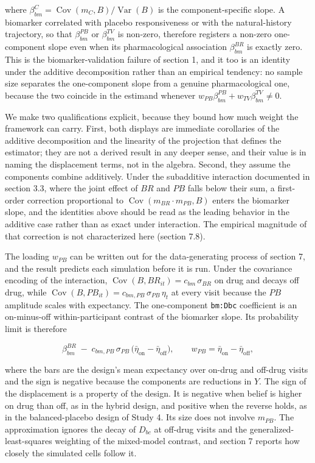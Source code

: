 \documentclass[
  11pt,
]{article}
\begin{document}
where \(\beta_{bm}^{C} = \operatorname{Cov}(m_C, B) / \operatorname{Var}(B)\) is
the component-specific slope. A biomarker correlated with placebo
responsiveness or with the natural-history trajectory, so that
\(\beta_{bm}^{PB}\) or \(\beta_{bm}^{TV}\) is non-zero, therefore registers a
non-zero one-component slope even when its pharmacological association
\(\beta_{bm}^{BR}\) is exactly zero. This is the biomarker-validation failure of
section 1, and it too is an identity under the additive decomposition rather
than an empirical tendency: no sample size separates the one-component slope
from a genuine pharmacological one, because the two coincide in the estimand
whenever \(w_{PB}\beta_{bm}^{PB} + w_{TV}\beta_{bm}^{TV} \ne 0\).

We make two qualifications explicit, because they bound how much weight the
framework can carry. First, both displays are immediate corollaries of the
additive decomposition and the linearity of the projection that defines the
estimator; they are not a derived result in any deeper sense, and their value
is in naming the displacement terms, not in the algebra. Second, they assume
the components combine additively. Under the subadditive interaction
documented in section 3.3, where the joint effect of \(BR\) and \(PB\) falls below
their sum, a first-order correction proportional to
\(\operatorname{Cov}(m_{BR}\cdot m_{PB}, B)\) enters the biomarker slope, and
the identities above should be read as the leading behavior in the additive
case rather than as exact under interaction. The empirical magnitude of that
correction is not characterized here (section 7.8).

The loading \(w_{PB}\) can be written out for the data-generating process
of section 7, and the result predicts each simulation before it is run.
Under the covariance encoding of the interaction, \(\operatorname{Cov}(B,
BR_{it}) = c_{bm}\,\sigma_{BR}\) on drug and decays off drug, while
\(\operatorname{Cov}(B, PB_{it}) = c_{bm,PB}\,\sigma_{PB}\,\eta_t\) at every
visit because the \(PB\) amplitude scales with expectancy. The one-component
\texttt{bm:Dbc} coefficient is an on-minus-off within-participant contrast
of the biomarker slope. Its probability limit is therefore

\[ \beta_{bm}^{BR} \;-\; c_{bm,PB}\,\sigma_{PB}\,\bigl(\bar\eta_{\text{on}}
- \bar\eta_{\text{off}}\bigr), \qquad w_{PB} = \bar\eta_{\text{on}} -
\bar\eta_{\text{off}}, \]

where the bars are the design's mean expectancy over on-drug and off-drug
visits and the sign is negative because the components are reductions in
\(Y\). The sign of the displacement is a property of the design. It is
negative when belief is higher on drug than off, as in the hybrid design,
and positive when the reverse holds, as in the balanced-placebo design of
Study 4. Its size does not involve \(m_{PB}\). The approximation ignores the
decay of \(D_{bc}\) at off-drug visits and the generalized-least-squares
weighting of the mixed-model contrast, and section 7 reports how closely
the simulated cells follow it.
\end{document}
